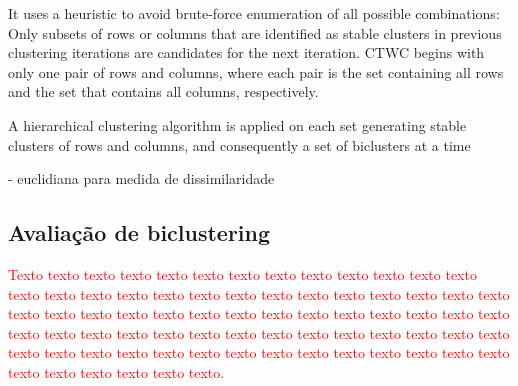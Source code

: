 \documentclass[normaltoc, espacoumemeio, pnumromarab,ruledheader]{abnt}
\begin{document}
 It uses a heuristic to avoid brute-force
enumeration of all possible combinations: Only subsets of
rows or columns that are identified as stable clusters in
previous clustering iterations are candidates for the next
iteration. CTWC begins with only one pair of rows and
columns, where each pair is the set containing all rows and
the set that contains all columns, respectively.


	A hierarchical
clustering algorithm is applied on each set generating
stable clusters of rows and columns, and consequently a set
of biclusters at a time

	- euclidiana para medida de dissimilaridade

	
	
	
	 \subsection{Avaliação de biclustering}
	
	\textcolor{red}{Texto texto texto texto texto texto texto texto texto texto texto texto texto texto texto texto texto texto texto texto texto texto texto texto texto texto texto texto texto texto texto texto texto texto texto texto texto texto texto texto texto texto texto texto texto texto texto texto texto texto texto texto texto texto texto texto texto texto texto texto texto texto texto texto texto texto texto texto texto texto texto texto texto texto texto.}
	
\end{document}
